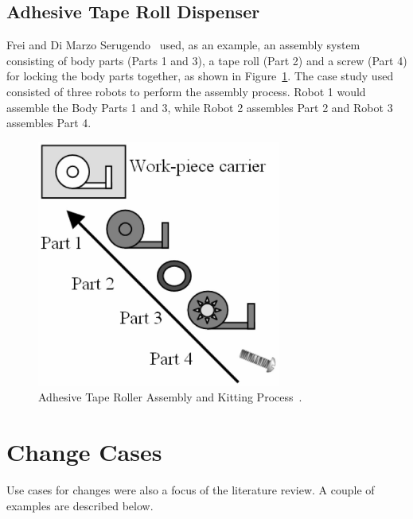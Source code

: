 \subsection{Adhesive Tape Roll Dispenser}
Frei and Di Marzo Serugendo~\cite{FREI.2008} used, as an example, an assembly system consisting of body parts (Parts 1 and 3), a tape roll (Part 2) and a screw (Part 4) for locking the body parts together, as shown in Figure~\ref{fig:Tony4}. The case study used consisted of three robots to perform the assembly process. Robot 1 would assemble the Body Parts 1 and 3, while Robot 2 assembles Part 2 and Robot 3 assembles Part 4.
\begin{figure}[!htb]
\centering
\includegraphics[width=8cm]{Figures/Tony-Fig4.jpg}
\caption{Adhesive Tape Roller Assembly and Kitting Process~\cite{FREI.2008}.}
\label{fig:Tony4}
\end{figure}
\section{Change Cases}
Use cases for changes were also a focus of the literature review. A couple of examples are described below.
